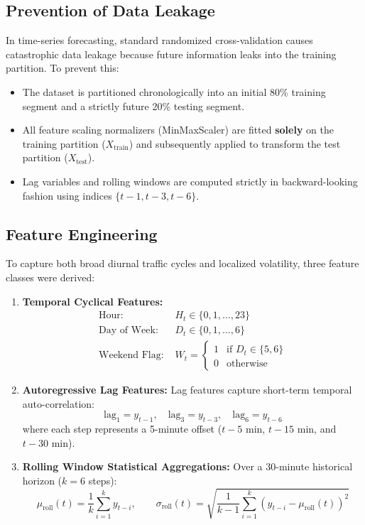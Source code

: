 \documentclass[12pt,a4paper]{article}
\begin{document}
\subsection{Prevention of Data Leakage}
In time-series forecasting, standard randomized cross-validation causes catastrophic data leakage because future information leaks into the training partition. To prevent this:
\begin{itemize}
    \item The dataset is partitioned chronologically into an initial 80\% training segment and a strictly future 20\% testing segment.
    \item All feature scaling normalizers (MinMaxScaler) are fitted \textbf{solely} on the training partition ($X_{\text{train}}$) and subsequently applied to transform the test partition ($X_{\text{test}}$).
    \item Lag variables and rolling windows are computed strictly in backward-looking fashion using indices $\{t-1, t-3, t-6\}$.
\end{itemize}

\subsection{Feature Engineering}
To capture both broad diurnal traffic cycles and localized volatility, three feature classes were derived:
\begin{enumerate}
    \item \textbf{Temporal Cyclical Features:}
    \begin{align}
        \text{Hour: } & H_t \in \{0, 1, \dots, 23\} \\
        \text{Day of Week: } & D_t \in \{0, 1, \dots, 6\} \\
        \text{Weekend Flag: } & W_t = \begin{cases} 1 & \text{if } D_t \in \{5, 6\} \\ 0 & \text{otherwise} \end{cases}
    \end{align}
    \item \textbf{Autoregressive Lag Features:}
    Lag features capture short-term temporal auto-correlation:
    \begin{equation}
        \text{lag}_1 = y_{t-1}, \quad \text{lag}_3 = y_{t-3}, \quad \text{lag}_6 = y_{t-6}
    \end{equation}
    where each step represents a 5-minute offset ($t-5$ min, $t-15$ min, and $t-30$ min).
    \item \textbf{Rolling Window Statistical Aggregations:}
    Over a 30-minute historical horizon ($k=6$ steps):
    \begin{equation}
        \mu_{\text{roll}}(t) = \frac{1}{k}\sum_{i=1}^k y_{t-i}, \qquad \sigma_{\text{roll}}(t) = \sqrt{\frac{1}{k-1}\sum_{i=1}^k \left(y_{t-i} - \mu_{\text{roll}}(t)\right)^2}
    \end{equation}
\end{enumerate}
\end{document}
